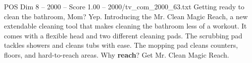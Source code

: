 \begin{textsample}{POS Dim 8 – 2000 – Score 1.00 – 2000/tv\_com\_2000\_63.txt}  \label{ex:f8_pos_040}
Getting ready to clean the bathroom, Mom?
Yep.
Introducing the Mr.
Clean Magic Reach, a new extendable cleaning tool that makes cleaning the bathroom less of a workout.
It comes with a flexible head and two different cleaning pads.
The scrubbing pad tackles showers and cleans tubs with ease.
The mopping pad cleans counters, floors, and hard-to-reach areas.
Why \textbf{reach}?
Get Mr.
Clean Magic Reach.

\end{textsample}
